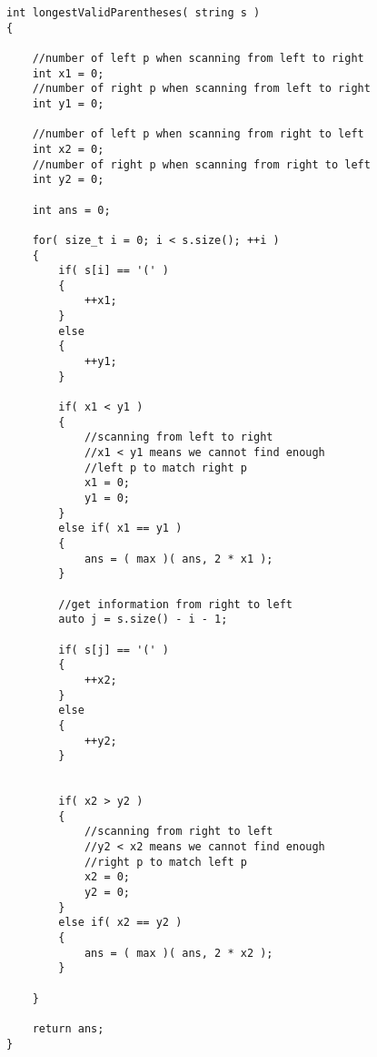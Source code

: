 \begin{lstlisting}[style=customc, caption={Double Counters}]
int longestValidParentheses( string s )
{

    //number of left p when scanning from left to right
    int x1 = 0;
    //number of right p when scanning from left to right
    int y1 = 0;

    //number of left p when scanning from right to left
    int x2 = 0;
    //number of right p when scanning from right to left
    int y2 = 0;

    int ans = 0;

    for( size_t i = 0; i < s.size(); ++i )
    {
        if( s[i] == '(' )
        {
            ++x1;
        }
        else
        {
            ++y1;
        }

        if( x1 < y1 )
        {
            //scanning from left to right
            //x1 < y1 means we cannot find enough
            //left p to match right p
            x1 = 0;
            y1 = 0;
        }
        else if( x1 == y1 )
        {
            ans = ( max )( ans, 2 * x1 );
        }

        //get information from right to left
        auto j = s.size() - i - 1;

        if( s[j] == '(' )
        {
            ++x2;
        }
        else
        {
            ++y2;
        }


        if( x2 > y2 )
        {
            //scanning from right to left
            //y2 < x2 means we cannot find enough
            //right p to match left p
            x2 = 0;
            y2 = 0;
        }
        else if( x2 == y2 )
        {
            ans = ( max )( ans, 2 * x2 );
        }

    }

    return ans;
}

\end{lstlisting}
